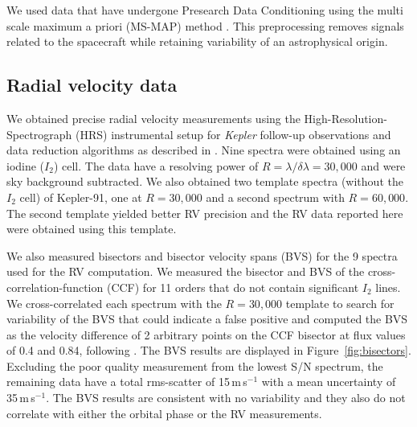 \documentclass[apjl]{emulateapj}
\begin{document}
We used data that have undergone Presearch Data Conditioning \citep{stumpe12,smith12} using the multi scale maximum a priori (MS-MAP) method \citep{stumpe14}. This preprocessing removes signals related to the spacecraft while retaining variability of an astrophysical origin.

\subsection{Radial velocity data}
We obtained precise radial velocity measurements using the High-Resolution-Spectrograph (HRS) \citep{tull98}
instrumental setup for \emph{Kepler} follow-up observations and data reduction algorithms as described in \citet{endl11}. Nine spectra were obtained using an iodine ($I_2$) cell. The data have a resolving power of $R = \lambda/\delta\lambda = 30,000$ and were sky background subtracted. We also obtained two template spectra (without the $I_2$ cell) of Kepler-91, one at $R=30,000$ and a second spectrum with $R=60,000$. The second template yielded better RV precision and the RV data reported here were obtained using this template.

We also measured bisectors and bisector velocity spans (BVS) for the 9 spectra used for the RV computation. We measured the bisector and BVS of the cross-correlation-function (CCF) for 11 orders that do not contain significant $I_2$ lines. We cross-correlated each spectrum with the $R=30,000$ template to search for variability of the BVS that could indicate a false positive and computed the BVS as the velocity difference of 2 arbitrary points on the CCF bisector at flux values of 0.4 and 0.84, following \citet{hatzes98}. The BVS results are displayed in Figure~\ref{fig:bisectors}. Excluding the poor
quality measurement from the lowest S/N spectrum, the remaining data have a total rms-scatter of 15\,m\,s$^{-1}$ with a mean uncertainty of 35\,m\,s$^{-1}$. The BVS results are consistent with no variability and they also do not correlate with either the orbital phase or the RV measurements.


\end{document}

